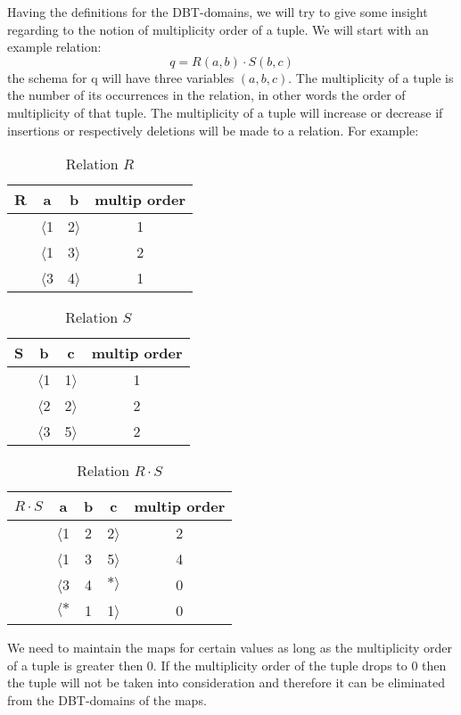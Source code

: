 \documentclass[12pt]{article}
\begin{document}
Having the definitions for the DBT-domains, we will try to give some insight regarding to the notion of multiplicity order of a tuple. We will start with an example relation: $$q=R(a,b)\cdot S(b,c)$$ the schema for q will have three variables $(a,b,c)$. The multiplicity of a tuple is the number of its occurrences in the relation, in other words the order of multiplicity of that tuple. The multiplicity of a tuple will increase or decrease if insertions or respectively deletions will be made to a relation. For example:
\begin{table}[ht]
\centering
\begin{tabular}{c c c c}
	R & a & b & multip order\\ [0.2ex]
	\hline
	  & $\langle $1 & 2$\rangle$ & 1 \\
	  & $\langle $1 & 3$\rangle$ & 2 \\
	  & $\langle $3 & 4$\rangle$ & 1 \\
\end{tabular}
\caption{Relation $R$}
\end{table}
\begin{table}[ht]
\centering
\begin{tabular}{c c c c}
	S & b & c & multip order\\ [0.2ex]
	\hline
	  & $\langle $1 & 1$\rangle$ & 1 \\
	  & $\langle $2 & 2$\rangle$ & 2 \\
	  & $\langle $3 & 5$\rangle$ & 2 \\
\end{tabular}
\caption{Relation $S$}
\end{table}
\begin{table}[ht]
\centering
\begin{tabular}{c c c c c}
	$R\cdot S$ & a & b & c & multip order\\ [0.2ex]
	\hline
	  & $\langle $1 & 2 & 2$\rangle$ & 2 \\
	  & $\langle $1 & 3 & 5$\rangle$ & 4 \\
	  & $\langle $3 & 4 & $*\rangle$ & 0 \\
	  & $\langle *$ & 1 & 1$\rangle$ & 0 \\
\end{tabular}
\caption{Relation $R\cdot S$}
\end{table}

We need to maintain the maps for certain values as long as the multiplicity order of a tuple is greater then 0. If the multiplicity order of the tuple drops to 0 then the tuple will not be taken into consideration and therefore it can be eliminated from the DBT-domains of the maps.
\end{document}
